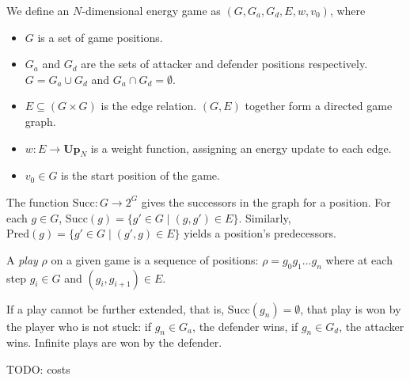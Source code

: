 \begin{definition} \label{def:energy_game}
    We define an $N$-dimensional energy game as
    $(G, G_a, G_d, E, w, v_0)$, where 
    \begin{itemize}
        \item $G$ is a set of game positions.
        \item $G_a$ and $G_d$ are the sets of attacker and defender positions
            respectively.
            $G = G_a \cup G_d$ and $G_a \cap G_d = \emptyset$.
        \item $E \subseteq (G \times G)$ is the edge relation. $(G, E)$
            together form a directed game graph.
        \item $w: E \rightarrow \mathbf{Up}_N$ is a weight function, assigning an
            energy update to each edge.
        \item $v_0 \in G$ is the start position of the game.
    \end{itemize}

    The function $\mathrm{Succ}: G \rightarrow 2^G$ gives the successors in the
    graph for a position.
    For each $g \in G$, $\mathrm{Succ}(g) = \{g' \in G \mid (g, g') \in E\}$.
    Similarly, $\mathrm{Pred}(g) = \{g' \in G \mid (g', g) \in E\}$ yields a
    position's predecessors.
\end{definition}

\begin{definition}
    A \emph{play} $\rho$ on a given game is a sequence of positions:
    $\rho = g_0g_1 \ldots g_n$ where at each step
    $g_i \in G$ and $(g_i, g_{i+1}) \in E$.

    If a play cannot be further extended, that is,
    $\mathrm{Succ}(g_n) = \emptyset$,
    that play is won by the player who is not stuck:
    if $g_n \in G_a$, the defender wins, if $g_n \in G_d$, the attacker wins.
    Infinite plays are won by the defender.

    \scriptsize{TODO: costs}
\end{definition}

